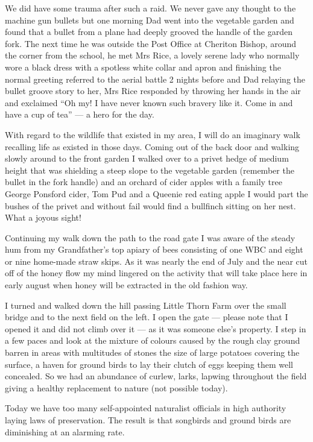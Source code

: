 We did have some trauma after such a raid. We never gave any thought to the
machine gun bullets but one morning Dad went into the vegetable garden and
found that a bullet from a plane had deeply grooved the handle of the garden
fork. The next time he was outside the Post Office at Cheriton Bishop, around
the corner from the school, he met Mrs Rice, a lovely serene lady who normally
wore a black dress with a spotless white collar and apron and finishing the
normal greeting referred to the aerial battle 2 nights before and Dad relaying
the bullet groove story to her, Mrs Rice responded by throwing her hands in the
air and exclaimed ``Oh my! I have never known such bravery like it. Come in
and have a cup of tea'' --- a hero for the day.

With regard to the wildlife that existed in my area, I will do an imaginary walk
recalling life as existed in those days. Coming out of the back door and
walking slowly around to the front garden I walked over to a privet hedge of
medium height that was shielding a steep slope to the vegetable garden
(remember the bullet in the fork handle) and an orchard of cider apples with a
family tree George Ponsford cider, Tom Pud and a Queenie red eating apple I
would part the bushes of the privet and without fail would find a bullfinch
sitting on her nest. What a joyous sight!

Continuing my walk down the path to the road gate I was aware of the steady hum
from my Grandfather's top apiary of bees consisting of one WBC and eight or
nine home-made straw skips. As it was nearly the end of July and the near cut
off of the honey flow my mind lingered on the activity that will take place
here in early august when honey will be extracted in the old fashion way.

I turned and walked down the hill passing Little Thorn Farm over the small
bridge and to the next field on the left. I open the gate --- please note that I
opened it and did not climb over it --- as it was someone else's property. I
step in a few paces and look at the mixture of colours caused by the rough clay
ground barren in areas with multitudes of stones the size of large potatoes
covering the surface, a haven for ground birds to lay their clutch of eggs
keeping them well concealed. So we had an abundance of curlew, larks, lapwing
throughout the field giving a healthy replacement to nature (not possible
today).

Today we have too many self-appointed naturalist officials in high authority
laying laws of preservation. The result is that songbirds and ground birds are
diminishing at an alarming rate.


